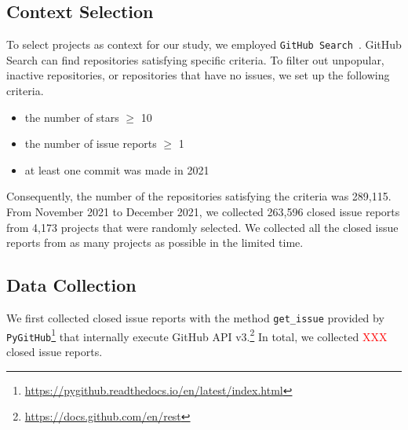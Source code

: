 \subsection{Context Selection}
\label{sec:design:context}
To select projects as context for our study, we employed \texttt{GitHub Search}~\citep{msr2021data}. GitHub Search can find repositories satisfying specific criteria. To filter out unpopular, inactive repositories, or repositories that have no issues, we set up the following criteria.
\begin{itemize}
	\item the number of stars $\geq$ 10
	\item the number of issue reports $\geq$ 1
	\item at least one commit was made in 2021
\end{itemize}
Consequently, the number of the repositories satisfying the criteria was 289,115. From November 2021 to December 2021, we collected 263,596 closed issue reports from 4,173 projects that were randomly selected. 
We collected all the closed issue reports from as many projects as possible in the limited time.  



% 

\subsection{Data Collection}
We first collected closed issue reports with the method \texttt{get\_issue} provided by  \texttt{PyGitHub}\footnote{\url{https://pygithub.readthedocs.io/en/latest/index.html}} that internally execute GitHub API v3.\footnote{\url{https://docs.github.com/en/rest}} In total, we collected \textcolor{red}{XXX} closed issue reports. 

